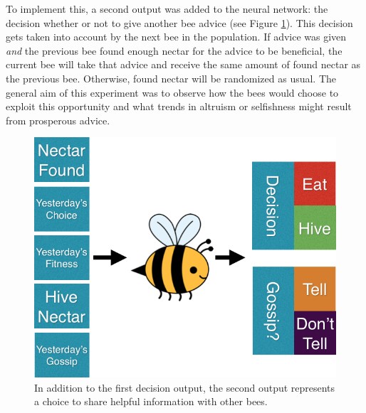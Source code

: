 \documentclass[11pt, letter]{article}
\begin{document}
			To implement this, a second output was added to the neural network: the decision whether or not to give another bee advice (see Figure \ref{fig:gossip_system}). This decision gets taken into account by the next bee in the population. If advice was given \emph{and} the previous bee found enough nectar for the advice to be beneficial, the current bee will take that advice and receive the same amount of found nectar as the previous bee. Otherwise, found nectar will be randomized as usual. The general aim of this experiment was to observe how the bees would choose to exploit this opportunity and what trends in altruism or selfishness might result from prosperous advice.


			\begin{figure}[tbph!]
				\begin{center}
					\includegraphics[scale=.5]{bee_diagrams/gossip_system.png}
				\end{center}
				\caption{In addition to the first decision output, the second output represents a choice to share helpful information with other bees.}
				\label{fig:gossip_system}
			\end{figure}
\end{document}
